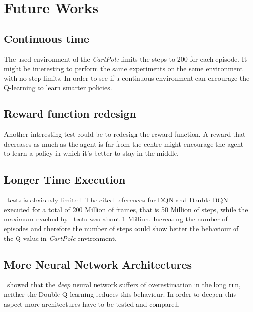 
\section{Future Works}

\subsection{Continuous time}

The used environment of the \textit{CartPole} limits the steps to 200 for each episode. It might be interesting to perform the same experiments on the same environment with no step limits. In order to see if a continuous environment can encourage the Q-learning to learn smarter policies.

\subsection{Reward function redesign}

Another interesting test could be to redesign the reward function. A reward that decreases as much as the agent is far from the centre might encourage the agent to learn a policy in which it's better to stay in the middle.

\subsection{Longer Time Execution}

\Authpp~tests is obviously limited. The cited references for DQN and Double DQN executed for a total of 200 Million of frames, that is 50 Million of steps, while the maximum reached by \authpp~tests was about 1 Million. Increasing the number of episodes and therefore the number of steps could show better the behaviour of the Q-value in \textit{CartPole} environment.

\subsection{More Neural Network Architectures}
\Auth~showed that the \textit{deep} neural network suffers of overestimation in the long run, neither the Double Q-learning reduces this behaviour. In order to deepen this aspect more architectures have to be tested and compared.